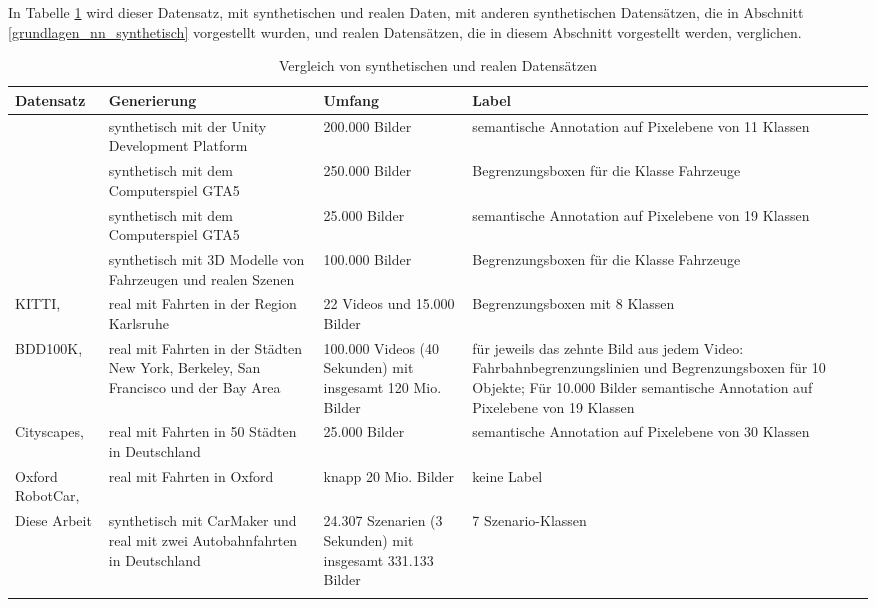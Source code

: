 In Tabelle \ref{tab_datensaetze} wird dieser Datensatz, mit synthetischen und realen Daten, mit anderen synthetischen Datensätzen, die in Abschnitt \ref{grundlagen_nn_synthetisch} vorgestellt wurden, und realen Datensätzen, die in diesem Abschnitt vorgestellt werden, verglichen.

\small
\begin{longtable}[c]{p{2cm} p{3cm} p{3cm} p{4cm}}
\textbf{Datensatz} & \textbf{Generierung} & \textbf{Umfang} & \textbf{Label} \\
\hline
\endhead

\cite{ros2016synthia} & synthetisch mit der Unity Development Platform & 200.000 Bilder & semantische Annotation auf Pixelebene von 11 Klassen  \\
\hline
\cite{johnson2017driving} & synthetisch mit dem Computerspiel GTA5 & 250.000 Bilder & Begrenzungsboxen für die Klasse Fahrzeuge \\
\hline
\cite{richter2016playing} & synthetisch mit dem Computerspiel GTA5 & 25.000 Bilder & semantische Annotation auf Pixelebene von 19 Klassen \\
\hline
\cite{tremblay2018training} & synthetisch mit 3D Modelle von Fahrzeugen und realen Szenen & 100.000 Bilder & Begrenzungsboxen für die Klasse Fahrzeuge \\
\hline
KITTI, \cite{geiger2013vision} & real mit Fahrten in der Region Karlsruhe & 22 Videos und 15.000 Bilder & Begrenzungsboxen mit 8 Klassen \\
\hline
BDD100K, \cite{yu2018bdd100k} & real mit Fahrten in der Städten New York, Berkeley, San Francisco und der Bay Area & 100.000 Videos (40 Sekunden) mit insgesamt 120 Mio. Bilder & für jeweils das zehnte Bild aus jedem Video: Fahrbahnbegrenzungslinien und Begrenzungsboxen für 10 Objekte; Für 10.000 Bilder semantische Annotation auf Pixelebene von 19 Klassen \\
\hline
Cityscapes, \cite{cordts2016cityscapes} & real mit Fahrten in 50 Städten in Deutschland & 25.000 Bilder & semantische Annotation auf Pixelebene von 30 Klassen \\
\hline
Oxford RobotCar, \cite{maddern20171} & real mit Fahrten in Oxford & knapp 20 Mio. Bilder & keine Label \\
\hline
Diese Arbeit & synthetisch mit CarMaker und real mit zwei Autobahnfahrten in Deutschland & 24.307 Szenarien (3 Sekunden) mit insgesamt 331.133 Bilder & 7 Szenario-Klassen \\

\hline
\caption{Vergleich von synthetischen und realen Datensätzen}
\label{tab_datensaetze}
\end{longtable}
\normalsize


